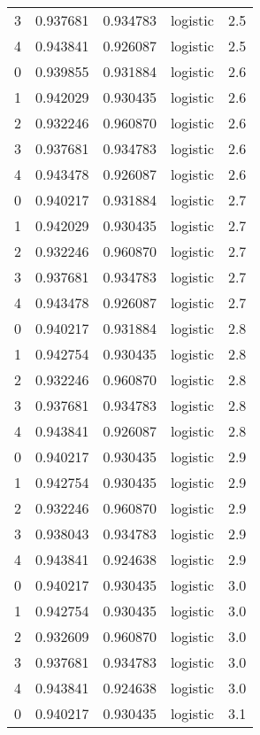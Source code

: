 \begin{tabular}{rrrlr}
     3 & 0.937681 & 0.934783 & logistic &        2.5 \\
     4 & 0.943841 & 0.926087 & logistic &        2.5 \\
     0 & 0.939855 & 0.931884 & logistic &        2.6 \\
     1 & 0.942029 & 0.930435 & logistic &        2.6 \\
     2 & 0.932246 & 0.960870 & logistic &        2.6 \\
     3 & 0.937681 & 0.934783 & logistic &        2.6 \\
     4 & 0.943478 & 0.926087 & logistic &        2.6 \\
     0 & 0.940217 & 0.931884 & logistic &        2.7 \\
     1 & 0.942029 & 0.930435 & logistic &        2.7 \\
     2 & 0.932246 & 0.960870 & logistic &        2.7 \\
     3 & 0.937681 & 0.934783 & logistic &        2.7 \\
     4 & 0.943478 & 0.926087 & logistic &        2.7 \\
     0 & 0.940217 & 0.931884 & logistic &        2.8 \\
     1 & 0.942754 & 0.930435 & logistic &        2.8 \\
     2 & 0.932246 & 0.960870 & logistic &        2.8 \\
     3 & 0.937681 & 0.934783 & logistic &        2.8 \\
     4 & 0.943841 & 0.926087 & logistic &        2.8 \\
     0 & 0.940217 & 0.930435 & logistic &        2.9 \\
     1 & 0.942754 & 0.930435 & logistic &        2.9 \\
     2 & 0.932246 & 0.960870 & logistic &        2.9 \\
     3 & 0.938043 & 0.934783 & logistic &        2.9 \\
     4 & 0.943841 & 0.924638 & logistic &        2.9 \\
     0 & 0.940217 & 0.930435 & logistic &        3.0 \\
     1 & 0.942754 & 0.930435 & logistic &        3.0 \\
     2 & 0.932609 & 0.960870 & logistic &        3.0 \\
     3 & 0.937681 & 0.934783 & logistic &        3.0 \\
     4 & 0.943841 & 0.924638 & logistic &        3.0 \\
     0 & 0.940217 & 0.930435 & logistic &        3.1 \\

\end{tabular}
